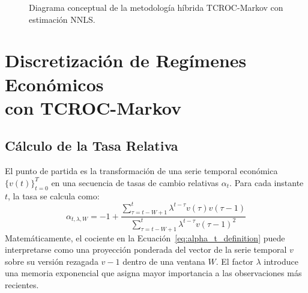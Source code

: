 \begin{figure}[H]
\centering
{}
\caption{Diagrama conceptual de la metodología híbrida TCROC-Markov con estimación NNLS.}
\label{fig:diagrama_conceptual}
\end{figure}

\section[Discretización de Regímenes con TCROC-Markov]{Discretización de Regímenes Económicos\\ con TCROC-Markov}
\label{sec:discretizacion_tcroc_markov}

\subsection{Cálculo de la Tasa Relativa}
El punto de partida es la transformación de una serie temporal económica $\{v(t)\}_{t=0}^T$ en una secuencia de tasas de cambio relativas \(\alpha_t\). Para cada instante \(t\), la tasa se calcula como:
\begin{equation}
\alpha_{t,\lambda,W} = -1 + \frac{\sum_{\tau=t-W+1}^t \lambda^{t-\tau} v(\tau)v(\tau-1)}{\sum_{\tau=t-W+1}^t \lambda^{t-\tau} v(\tau-1)^2}
\label{eq:alpha_t_definition}
\end{equation}
Matemáticamente, el cociente en la Ecuación~\ref{eq:alpha_t_definition} puede interpretarse como una proyección ponderada del vector de la serie temporal \(v\) sobre su versión rezagada \(v-1\) dentro de una ventana \(W\). El factor \(\lambda\) introduce una memoria exponencial que asigna mayor importancia a las observaciones más recientes.

